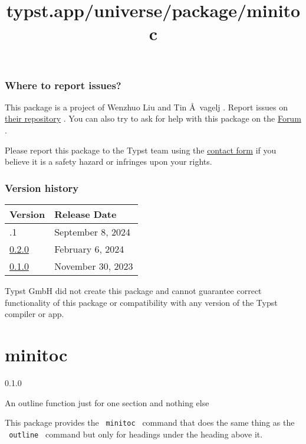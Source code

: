 \subsubsection{Where to report issues?}\label{where-to-report-issues}

This package is a project of Wenzhuo Liu and Tin Å~vagelj . Report
issues on \href{https://github.com/Enter-tainer/zint-wasi}{their
repository} . You can also try to ask for help with this package on the
\href{https://forum.typst.app}{Forum} .

Please report this package to the Typst team using the
\href{https://typst.app/contact}{contact form} if you believe it is a
safety hazard or infringes upon your rights.

\label{versions}
\subsubsection{Version history}\label{version-history}

\begin{longtable}[]{@{}ll@{}}
\toprule\noalign{}
Version & Release Date \\
\midrule\noalign{}
\endhead
\bottomrule\noalign{}
\endlastfoot
0.2.1 & September 8, 2024 \\
\href{https://typst.app/universe/package/tiaoma/0.2.0/}{0.2.0} &
February 6, 2024 \\
\href{https://typst.app/universe/package/tiaoma/0.1.0/}{0.1.0} &
November 30, 2023 \\
\end{longtable}

Typst GmbH did not create this package and cannot guarantee correct
functionality of this package or compatibility with any version of the
Typst compiler or app.


\title{typst.app/universe/package/minitoc}

\label{banner}
\section{minitoc}\label{minitoc}

{ 0.1.0 }

An outline function just for one section and nothing else

\label{readme}
This package provides the \texttt{\ minitoc\ } command that does the
same thing as the \texttt{\ outline\ } command but only for headings
under the heading above it.

